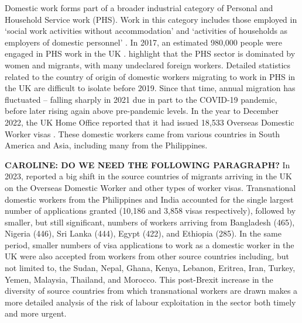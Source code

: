 \documentclass[
  12pt,
  letterpaper,
  DIV=11,
  numbers=noendperiod]{scrartcl}
\theoremstyle{plain}
\theoremstyle{definition}
\begin{document}
Domestic work forms part of a broader industrial category of Personal
and Household Service work (PHS). Work in this category includes those
employed in `social work activities without accommodation' and
`activities of households as employers of domestic personnel'
\autocite{european_commission_staff_2012}. In 2017, an estimated 980,000
people were engaged in PHS work in the UK
\autocite{manoudi_analysis_2018}. \textcite{manoudi_analysis_2018}
highlight that the PHS sector is dominated by women and migrants, with
many undeclared foreign workers. Detailed statistics related to the
country of origin of domestic workers migrating to work in PHS in the UK
are difficult to isolate before 2019. Since that time, annual migration
has fluctuated -- falling sharply in 2021 due in part to the COVID-19
pandemic, before later rising again above pre-pandemic levels. In the
year to December 2022, the UK Home Office reported that it had issued
18,533 Overseas Domestic Worker visas \autocite{home_office_why_2023}.
These domestic workers came from various countries in South America and
Asia, including many from the Philippines.

\textbf{CAROLINE: DO WE NEED THE FOLLOWING PARAGRAPH?} In 2023,
\textcite{strauss_britain_2023} reported a big shift in the source
countries of migrants arriving in the UK on the Overseas Domestic Worker
and other types of worker visas. Transnational domestic workers from the
Philippines and India accounted for the single largest number of
applications granted (10,186 and 3,858 visas respectively), followed by
smaller, but still significant, numbers of workers arriving from
Bangladesh (465), Nigeria (446), Sri Lanka (444), Egypt (422), and
Ethiopia (285). In the same period, smaller numbers of visa applications
to work as a domestic worker in the UK were also accepted from workers
from other source countries including, but not limited to, the Sudan,
Nepal, Ghana, Kenya, Lebanon, Eritrea, Iran, Turkey, Yemen, Malaysia,
Thailand, and Morocco. This post-Brexit increase in the diversity of
source countries from which transnational workers are drawn makes a more
detailed analysis of the risk of labour exploitation in the sector both
timely and more urgent.
\end{document}
